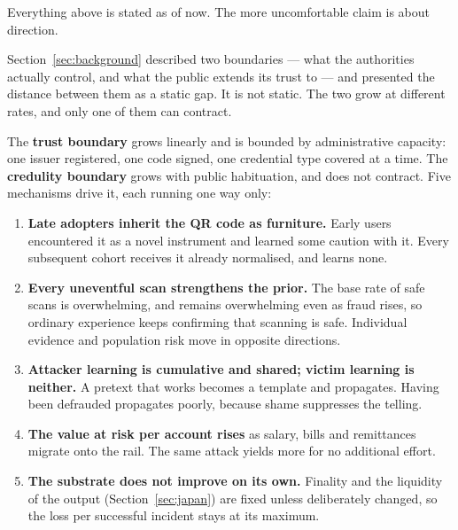 \documentclass[10pt,a4paper,twocolumn]{article}
\begin{document}
Everything above is stated as of now. The more uncomfortable claim is about
direction.

Section~\ref{sec:background} described two boundaries --- what the authorities
actually control, and what the public extends its trust to --- and presented the
distance between them as a static gap. It is not static. The two grow at
different rates, and only one of them can contract.

The \textbf{trust boundary} grows linearly and is bounded by administrative
capacity: one issuer registered, one code signed, one credential type covered at
a time. The \textbf{credulity boundary} grows with public habituation, and does
not contract. Five mechanisms drive it, each running one way only:

\begin{enumerate}[leftmargin=1.6em]
  \item \textbf{Late adopters inherit the QR code as furniture.} Early users
    encountered it as a novel instrument and learned some caution with it. Every
    subsequent cohort receives it already normalised, and learns none.
  \item \textbf{Every uneventful scan strengthens the prior.} The base rate of
    safe scans is overwhelming, and remains overwhelming even as fraud rises, so
    ordinary experience keeps confirming that scanning is safe. Individual
    evidence and population risk move in opposite directions.
  \item \textbf{Attacker learning is cumulative and shared; victim learning is
    neither.} A pretext that works becomes a template and propagates. Having
    been defrauded propagates poorly, because shame suppresses the telling.
  \item \textbf{The value at risk per account rises} as salary, bills and
    remittances migrate onto the rail. The same attack yields more for no
    additional effort.
  \item \textbf{The substrate does not improve on its own.} Finality and the
    liquidity of the output (Section~\ref{sec:japan}) are fixed unless
    deliberately changed, so the loss per successful incident stays at its
    maximum.
\end{enumerate}
\end{document}
